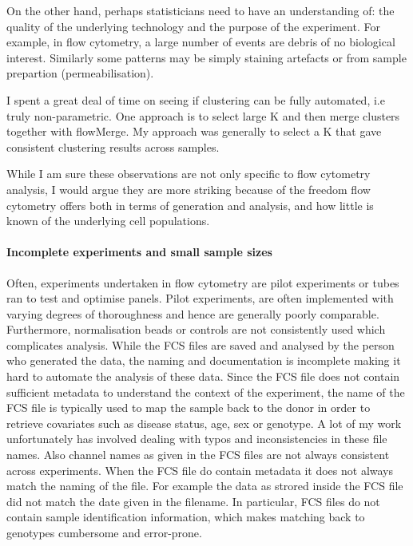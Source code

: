 On the other hand, perhaps statisticians need to have an understanding of: the quality of the underlying technology and the purpose of the experiment.
For example, in flow cytometry, a large number of events are debris of no biological interest.
Similarly some patterns may be simply staining artefacts or from sample prepartion (permeabilisation).

I spent a great deal of time on seeing if clustering can be fully automated, i.e truly non-parametric.
One approach is to select large K and then merge clusters together with flowMerge.
My approach was generally to select a K that gave consistent clustering results across samples.

While I am sure these observations are not only specific to flow cytometry analysis, I would argue they are more striking because of the freedom flow cytometry offers both in terms of generation and analysis, and how little is known of the underlying cell populations.


\paragraph{ Incomplete experiments and small sample sizes}

Often, experiments undertaken in flow cytometry are pilot experiments or tubes ran to test and optimise panels.
Pilot experiments,
are often implemented with varying degrees of thoroughness and hence are generally poorly comparable.
Furthermore, normalisation beads or controls are not consistently used which complicates analysis.
While the FCS files are saved and analysed by the person who generated the data, the naming and documentation is incomplete
making it hard to automate the analysis of these data.
Since the FCS file does not contain sufficient metadata to understand the context of the experiment, the name of the FCS
file is typically used to map the sample back to the donor in order to retrieve covariates such as disease status, age, sex or genotype.
A lot of my work unfortunately has involved dealing with typos and inconsistencies in these file names.
Also channel names as given in the FCS files are not always consistent across experiments.
When the FCS file do contain metadata it does not always match the naming of the file.
For example the data as strored inside the FCS file did not match the date given in the filename.
In particular, FCS files do not contain sample identification information, which makes matching back to genotypes cumbersome and error-prone.

